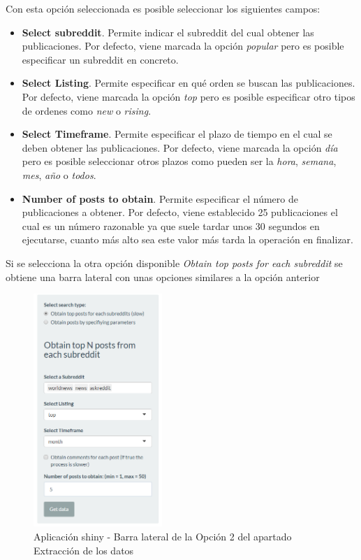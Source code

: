 \documentclass[../../main.tex]{subfiles}
\begin{document}
Con esta opción seleccionada es posible seleccionar los siguientes campos:
\begin{itemize}
    \item \textbf{Select \Gls{subreddit}}. Permite indicar el \gls{subreddit} del cual obtener las publicaciones. Por defecto, viene marcada la opción \textit{popular} pero es posible especificar un subreddit en concreto. 
    \item \textbf{Select Listing}. Permite especificar en qué orden se buscan las publicaciones. Por defecto, viene marcada la opción \textit{top} pero es posible especificar otro tipos de ordenes como \textit{new} o \textit{rising}.
    \item \textbf{Select Timeframe}. Permite especificar el plazo de tiempo en el cual se deben obtener las publicaciones. Por defecto, viene marcada la opción \textit{día} pero es posible seleccionar otros plazos como pueden ser la \textit{hora}, \textit{semana}, \textit{mes}, \textit{año} o \textit{todos}.
    \item \textbf{Number of posts to obtain}. Permite especificar el número de publicaciones a obtener. Por defecto, viene establecido 25 publicaciones el cual es un número razonable ya que suele tardar unos 30 segundos en ejecutarse, cuanto más alto sea este valor más tarda la operación en finalizar.
\end{itemize}

Si se selecciona la otra opción disponible \textit{Obtain top posts for each subreddit} se obtiene una barra lateral con unas opciones similares a la opción anterior

\begin{figure}[H]
\centering
\includegraphics[height=250pt]{images/apendices/data-extract2.1.png}
\caption{Aplicación \Gls{shiny} - Barra lateral de la Opción 2 del apartado Extracción de los datos}
\end{figure}
\end{document}
